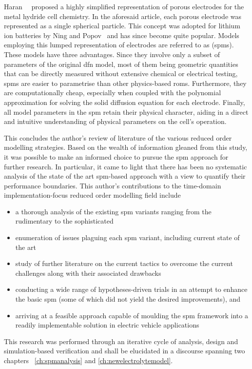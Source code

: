 Haran~\etal{}~\cite{Haran1998}  proposed a  highly simplified  representation of
porous  electrodes  for the  metal  hydride  cell  chemistry. In  the  aforesaid
article,  each   porous  electrode  was   represented  as  a   single  spherical
particle.  This concept  was  adopted  for lithium  ion  batteries  by Ning  and
Popov~\cite{Ning2004} and has since become  quite popular. Models employing this
lumped  representation  of  electrodes  are referred  to  as  
(\glspl{spm}).  These models  have  three advantages.  Since  they involve  only
a  subset  of  parameters  of  the   original  \gls{dfn}  model,  most  of  them
being  geometric quantities  that  can be  directly  measured without  extensive
chemical  or electrical  testing,  \glspl{spm} are  easier  to parametrise  than
other physics-based  \glspl{rom}. Furthermore,  they are  computationally cheap,
especially when coupled with the  polynomial approximation for solving the solid
diffusion  equation for  each electrode.  Finally, all  model parameters  in the
\gls{spm}  retain their  physical character,  aiding in  a direct  and intuitive
understanding of physical parameters on the cell's operation.

This concludes  the author's review of  literature of the various  reduced order
modelling  strategies. Based  on the  wealth  of information  gleaned from  this
study,  it was  possible to  make  an informed  choice to  pursue the  \gls{spm}
approach  for further  research.  In particular,  it came  to  light that  there
has  been  no systematic  analysis  of  the  state  of the  art  \gls{spm}-based
approach with  a view  to quantify their  performance boundaries.  This author's
contributions to  the time-domain  implementation-focus reduced  order modelling
field include
\begin{itemize}[noitemsep,topsep=0pt, before={\vspace*{-0.25\baselineskip}}]
    \item a thorough analysis of the existing \gls{spm} variants ranging from the rudimentary to the sophisticated
    \item enumeration of issues plaguing each \gls{spm} variant, including current state of the art
    \item study of further literature on the current tactics to overcome the current challenges along with their associated drawbacks
    \item conducting a  wide range of hypotheses-driven trials in an attempt to enhance  the basic \gls{spm} (some of which did not yield the desired
        improvements), and
    \item arriving at  a  feasible  approach  capable  of  moulding  the
        \gls{spm}  framework into  a  readily implementable  solution in
        electric vehicle applications
\end{itemize}
This research was  performed through an iterative cycle of  analysis, design and
simulation-based verification  and shall be  elucidated in a  discourse spanning
two chapters \viz~\cref{ch:spmanalysis} and \cref{ch:newelectrolytemodel}.

